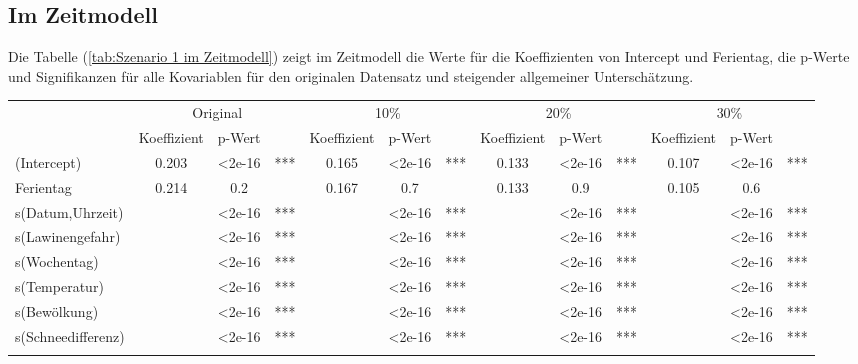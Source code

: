 \documentclass[12pt]{scrreprt}
\begin{document}
\subsection{Im Zeitmodell}
Die Tabelle (\ref{tab:Szenario 1 im Zeitmodell}) zeigt im Zeitmodell die Werte für die Koeffizienten von Intercept und Ferientag, die p-Werte und Signifikanzen für alle Kovariablen für den originalen Datensatz und steigender allgemeiner Unterschätzung.  
\begin{table}[htbp]
	\centering
	\begin{adjustbox}{max width=\textwidth}
	\begin{tabular}{l|ccc|ccc|ccc|ccc|}
		\multicolumn{1}{r}{} & \multicolumn{3}{c}{Original} & \multicolumn{3}{c}{10\%} & \multicolumn{3}{c}{20\%} & \multicolumn{3}{c}{30\%} \\
		& Koeffizient & p-Wert &       & Koeffizient & p-Wert &       & Koeffizient & p-Wert &       & Koeffizient & p-Wert & \multicolumn{1}{c}{} \\
		\cmidrule{2-13}    (Intercept) & 0.203 & <2e-16 & ***   & 0.165 & <2e-16 & ***   & 0.133 & <2e-16 & ***   & 0.107 & <2e-16 & *** \\
		Ferientag & 0.214 & 0.2   &       & 0.167 & 0.7   &       & 0.133 & 0.9   &       & 0.105 & 0.6   &   \\
		s(Datum,Uhrzeit) &       & <2e-16 & ***   &       & <2e-16 & ***   &       & <2e-16 & ***   &       & <2e-16 & *** \\
		s(Lawinengefahr) &       & <2e-16 & ***   &       & <2e-16 & ***   &       & <2e-16 & ***   &       & <2e-16 & *** \\
		s(Wochentag) &       & <2e-16 & ***   &       & <2e-16 & ***   &       & <2e-16 & ***   &       & <2e-16 & *** \\
		s(Temperatur) &       & <2e-16 & ***   &       & <2e-16 & ***   &       & <2e-16 & ***   &       & <2e-16 & *** \\
		s(Bewölkung) &       & <2e-16 & ***   &       & <2e-16 & ***   &       & <2e-16 & ***   &       & <2e-16 & *** \\
		s(Schneedifferenz) &       & <2e-16 & ***   &       & <2e-16 & ***   &       & <2e-16 & ***   &       & <2e-16 & *** \\
		\cmidrule{2-13}    \multicolumn{1}{r}{} &       &       & \multicolumn{1}{c}{} &       &       & \multicolumn{1}{c}{} &       &       & \multicolumn{1}{c}{} &       &       & \multicolumn{1}{c}{} \\

\end{tabular}
\end{adjustbox}
\end{table}
\end{document}
